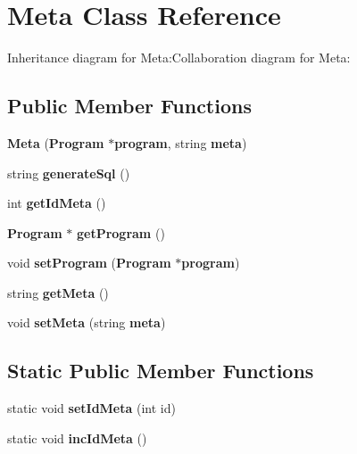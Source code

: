 \section{Meta Class Reference}
\label{classbr_1_1ufscar_1_1lince_1_1ginga_1_1recommender_1_1Meta}
Inheritance diagram for Meta:Collaboration diagram for Meta:\subsection*{Public Member Functions}
\begin{CompactItemize}
\item 
\textbf{Meta} ({\bf Program} $\ast${\bf program}, string {\bf meta})\label{classbr_1_1ufscar_1_1lince_1_1ginga_1_1recommender_1_1Meta_d8af7b570cc2f138c336b58b6604a9b6}

\item 
string \textbf{generateSql} ()\label{classbr_1_1ufscar_1_1lince_1_1ginga_1_1recommender_1_1Meta_8f1e45f781da9a5727416350efd7d586}

\item 
int \textbf{getIdMeta} ()\label{classbr_1_1ufscar_1_1lince_1_1ginga_1_1recommender_1_1Meta_d2958e84f411e26fd0688cea4eea7adc}

\item 
{\bf Program} $\ast$ \textbf{getProgram} ()\label{classbr_1_1ufscar_1_1lince_1_1ginga_1_1recommender_1_1Meta_ac039640546a9d50c3c501ddfd52d4b1}

\item 
void \textbf{setProgram} ({\bf Program} $\ast${\bf program})\label{classbr_1_1ufscar_1_1lince_1_1ginga_1_1recommender_1_1Meta_c6b5dabe8a4be0d8d4fda3c713347609}

\item 
string \textbf{getMeta} ()\label{classbr_1_1ufscar_1_1lince_1_1ginga_1_1recommender_1_1Meta_308f257533c0c711c0f2c8ca9aff6e78}

\item 
void \textbf{setMeta} (string {\bf meta})\label{classbr_1_1ufscar_1_1lince_1_1ginga_1_1recommender_1_1Meta_de68df0e4b1fec38a056dc040be2e23b}

\end{CompactItemize}
\subsection*{Static Public Member Functions}
\begin{CompactItemize}
\item 
static void \textbf{setIdMeta} (int id)\label{classbr_1_1ufscar_1_1lince_1_1ginga_1_1recommender_1_1Meta_16ec16f828947671d5039c2deb0cc72d}

\item 
static void \textbf{incIdMeta} ()\label{classbr_1_1ufscar_1_1lince_1_1ginga_1_1recommender_1_1Meta_22f7a8edba5a85272c505f32d3720a19}

\end{CompactItemize}
